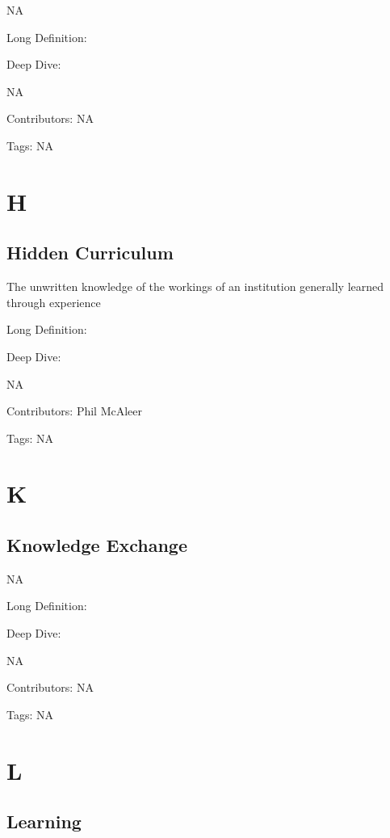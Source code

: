 \documentclass[
  letterpaper,
  DIV=11,
  numbers=noendperiod]{scrreprt}
\begin{document}
NA

Long Definition:

Deep Dive:

NA

Contributors: NA

Tags: NA


\chapter{H}\label{h}

\section{Hidden Curriculum}\label{hidden-curriculum}

The unwritten knowledge of the workings of an institution generally
learned through experience

Long Definition:

Deep Dive:

NA

Contributors: Phil McAleer

Tags: NA


\chapter{K}\label{k}

\section{Knowledge Exchange}\label{knowledge-exchange}

NA

Long Definition:

Deep Dive:

NA

Contributors: NA

Tags: NA


\chapter{L}\label{l}

\section{Learning}\label{learning}
\end{document}

